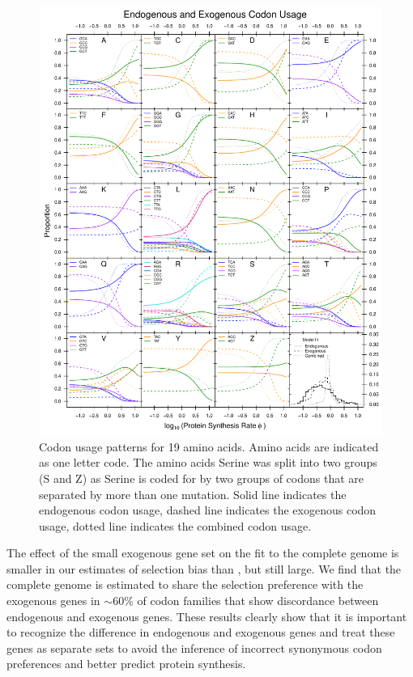 \documentclass[fleqn,letterpaper]{article}
\begin{document}
\begin{figure}
     \centering
	\includegraphics[width=\textwidth]{img/CUB_cleft_main.pdf}
	\caption{Codon usage patterns for 19 amino acids. Amino acids are indicated as one letter code. 
	The amino acids Serine was split into two groups (S and Z) as Serine is coded for by two groups of codons that are separated by more than one mutation.
	Solid line indicates the endogenous codon usage, dashed line indicates the exogenous codon usage, dotted line indicates the combined codon usage.}
	\label{fig:cub_all_sets}
\end{figure}

The effect of the small exogenous gene set on the fit to the complete \kluyveri genome is smaller in our estimates of selection bias \DE than \DM, but still large.
We find that the complete \kluyveri genome is estimated to share the selection preference with the exogenous genes in $\sim60\%$ of codon families that show discordance between endogenous and exogenous genes.
These results clearly show that it is important to recognize the difference in endogenous and exogenous genes and treat these genes as separate sets to avoid the inference of incorrect synonymous codon preferences and better predict protein synthesis.
\end{document}
